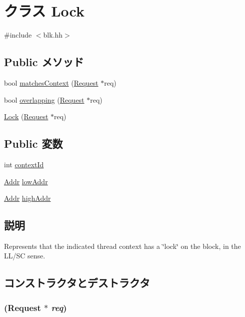 \hypertarget{classCacheBlk_1_1Lock}{
\section{クラス Lock}
\label{classCacheBlk_1_1Lock}
}


{\ttfamily \#include $<$blk.hh$>$}\subsection*{Public メソッド}
\begin{DoxyCompactItemize}
\item 
bool \hyperlink{classCacheBlk_1_1Lock_a9f8924af3cc47fae92635799f8742723}{matchesContext} (\hyperlink{classRequest}{Request} $\ast$req)
\item 
bool \hyperlink{classCacheBlk_1_1Lock_a2c43977447f93934a8f4699a926becc5}{overlapping} (\hyperlink{classRequest}{Request} $\ast$req)
\item 
\hyperlink{classCacheBlk_1_1Lock_a14f9ea74a553885b905e66eda447908a}{Lock} (\hyperlink{classRequest}{Request} $\ast$req)
\end{DoxyCompactItemize}
\subsection*{Public 変数}
\begin{DoxyCompactItemize}
\item 
int \hyperlink{classCacheBlk_1_1Lock_a5093029b16dfe14cea58c94fea417e01}{contextId}
\item 
\hyperlink{base_2types_8hh_af1bb03d6a4ee096394a6749f0a169232}{Addr} \hyperlink{classCacheBlk_1_1Lock_ae931bbd66f3984254c5845fe61176eef}{lowAddr}
\item 
\hyperlink{base_2types_8hh_af1bb03d6a4ee096394a6749f0a169232}{Addr} \hyperlink{classCacheBlk_1_1Lock_ad1022e5c9295bf55310b4a4e96d13ef1}{highAddr}
\end{DoxyCompactItemize}


\subsection{説明}
Represents that the indicated thread context has a \char`\"{}lock\char`\"{} on the block, in the LL/SC sense. 

\subsection{コンストラクタとデストラクタ}
\hypertarget{classCacheBlk_1_1Lock_a14f9ea74a553885b905e66eda447908a}{
\subsubsection[{Lock}]{ ({\bf Request} $\ast$ {\em req})}}
\label{classCacheBlk_1_1Lock_a14f9ea74a553885b905e66eda447908a}



